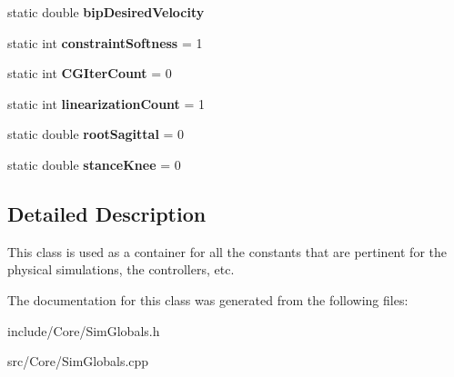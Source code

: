 \begin{DoxyCompactItemize}
\item 
\hypertarget{classCartWheel_1_1Core_1_1SimGlobals_a711e8b6bb40da37055cc1da4696066c9}{
static double {\bfseries bipDesiredVelocity}}
\label{classCartWheel_1_1Core_1_1SimGlobals_a711e8b6bb40da37055cc1da4696066c9}

\item 
\hypertarget{classCartWheel_1_1Core_1_1SimGlobals_a3ecf56f5de0b8b97e22331ad3741584e}{
static int {\bfseries constraintSoftness} = 1}
\label{classCartWheel_1_1Core_1_1SimGlobals_a3ecf56f5de0b8b97e22331ad3741584e}

\item 
\hypertarget{classCartWheel_1_1Core_1_1SimGlobals_a037a9992ddd73e22d377d9a58ec0b706}{
static int {\bfseries CGIterCount} = 0}
\label{classCartWheel_1_1Core_1_1SimGlobals_a037a9992ddd73e22d377d9a58ec0b706}

\item 
\hypertarget{classCartWheel_1_1Core_1_1SimGlobals_acdd604081436757447cc00525e24a96a}{
static int {\bfseries linearizationCount} = 1}
\label{classCartWheel_1_1Core_1_1SimGlobals_acdd604081436757447cc00525e24a96a}

\item 
\hypertarget{classCartWheel_1_1Core_1_1SimGlobals_a68d7f06e522d75a777058df9cdc117ba}{
static double {\bfseries rootSagittal} = 0}
\label{classCartWheel_1_1Core_1_1SimGlobals_a68d7f06e522d75a777058df9cdc117ba}

\item 
\hypertarget{classCartWheel_1_1Core_1_1SimGlobals_a91ecb88e7e37ba0b8fdde85abbad99c6}{
static double {\bfseries stanceKnee} = 0}
\label{classCartWheel_1_1Core_1_1SimGlobals_a91ecb88e7e37ba0b8fdde85abbad99c6}

\end{DoxyCompactItemize}


\subsection{Detailed Description}
This class is used as a container for all the constants that are pertinent for the physical simulations, the controllers, etc. 

The documentation for this class was generated from the following files:\begin{DoxyCompactItemize}
\item 
include/Core/SimGlobals.h\item 
src/Core/SimGlobals.cpp\end{DoxyCompactItemize}

